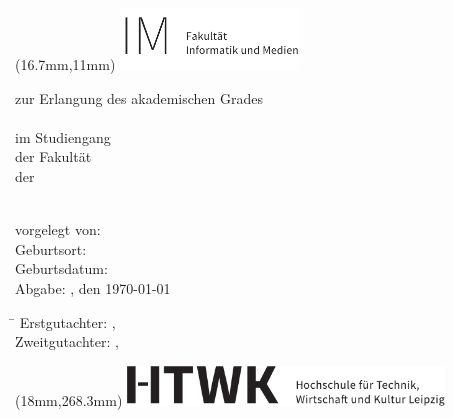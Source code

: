 

\begin{titlepage}
	\noindent
\begin{textblock*}{4.74cm}(16.7mm,11mm)
\includegraphics[width=4.74cm]{anlagen/bilder/logos/HTWK-Fakultaetszusatz_IM_schwarz_de-eps-converted-to.pdf}
\end{textblock*}
\begin{center}

\vspace*{0.5cm}

\large
{\textsc{\Large \abschlussarbeit}}

\vspace*{0.5cm}
zur Erlangung des akademischen Grades\\[0.6cm]
\studienganggrad\\[0.6cm]
im Studiengang \studiengang\\
der Fakultät \fakultaet\\
der \hochschule\ \ort \newline\\

{\LARGE \textbf{\titel}}\\
{\LARGE \textbf{\subtitel}}

\end{center}


\vspace*{2cm}
vorgelegt von: \autor\\
Geburtsort: \geburtsort\\
Geburtsdatum: \geburtstag\\
Abgabe: \ort, den \today


\vspace*{1cm}
\large
\begin{tabbing}
\hspace{4cm}\=\kill
Erstgutachter:  \> \erstgutachter, \instituteErstgutachter\\ 
Zweitgutachter: \> \zweitgutachter, \instituteZweitgutachter\\
\end{tabbing} 

\begin{textblock*}{8.41cm}(18mm,268.3mm)
\includegraphics[width=8.41cm]{anlagen/bilder/logos/htwk-logo-eps-converted-to.pdf}
\end{textblock*}

\end{titlepage}
